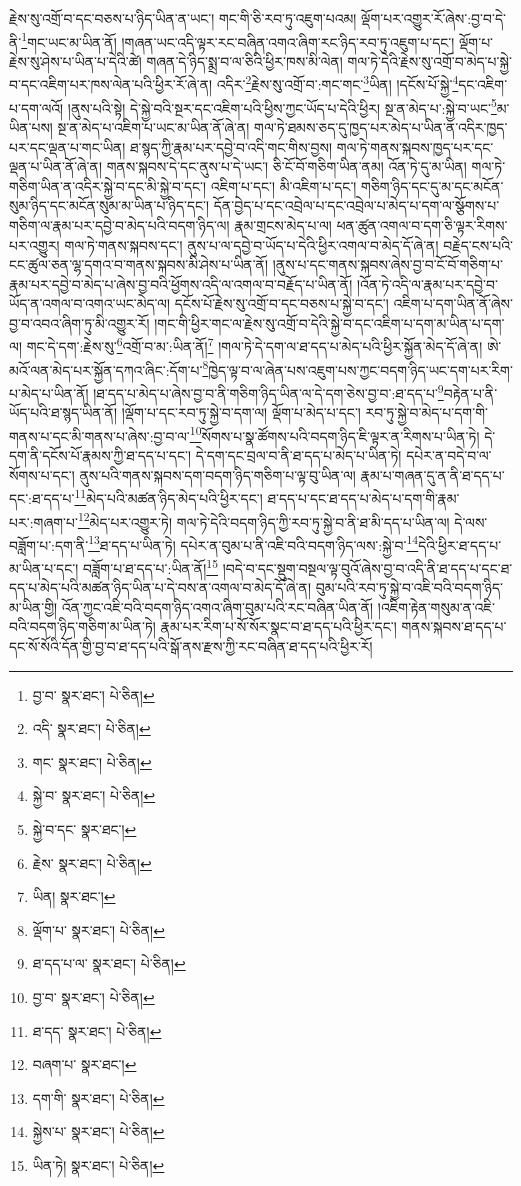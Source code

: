 རྗེས་སུ་འགྲོ་བ་དང་བཅས་པ་ཉིད་ཡིན་ན་ཡང་། གང་གི་ཅི་རབ་ཏུ་འཇུག་པའམ། ལྡོག་པར་འགྱུར་རོ་ཞེས་:བྱ་བ་དེ་ནི་\footnote{བྱ་བ་  སྣར་ཐང་།  པེ་ཅིན། }གང་ཡང་མ་ཡིན་ནོ། །གཞན་ཡང་འདི་ལྟར་རང་བཞིན་འགའ་ཞིག་རང་ཉིད་རབ་ཏུ་འཇུག་པ་དང་། ལྡོག་པ་རྗེས་སུ་ཤེས་པ་ཡིན་པ་དེའི་ཚེ། གཞན་དེ་ཉིད་སྨྲ་བ་ལ་ཅིའི་ཕྱིར་ཁས་མི་ལེན། གལ་ཏེ་དེའི་རྗེས་སུ་འགྲོ་བ་མེད་པ་སྐྱེ་བ་དང་འཇིག་པར་ཁས་ལེན་པའི་ཕྱིར་རོ་ཞེ་ན། འདིར་\footnote{འདི་  སྣར་ཐང་།  པེ་ཅིན། }རྗེས་སུ་འགྲོ་བ་:གང་གང་\footnote{གང་  སྣར་ཐང་།  པེ་ཅིན། }ཡིན། །དངོས་པོ་སྐྱེ་\footnote{སྐྱེ་བ་  སྣར་ཐང་།  པེ་ཅིན། }དང་འཇིག་པ་དག་ལའོ། །ནུས་པའི་སྟེ། དེ་སྐྱེ་བའི་སྔར་དང་འཇིག་པའི་ཕྱིས་ཀྱང་ཡོད་པ་དེའི་ཕྱིར། སྔ་ན་མེད་པ་:སྐྱེ་བ་ཡང་\footnote{སྐྱེ་བ་དང་  སྣར་ཐང་། }མ་ཡིན་པས། སྔ་ན་མེད་པ་འཇིག་པ་ཡང་མ་ཡིན་ནོ་ཞེ་ན། གལ་ཏེ་ཐམས་ཅད་དུ་ཁྱད་པར་མེད་པ་ཡིན་ན་འདིར་ཁྱད་པར་དང་ལྡན་པ་གང་ཡིན། ཐ་སྙད་ཀྱི་རྣམ་པར་དབྱེ་བ་འདི་གང་གིས་བྱས། གལ་ཏེ་གནས་སྐབས་ཁྱད་པར་དང་ལྡན་པ་ཡིན་ནོ་ཞེ་ན། གནས་སྐབས་དེ་དང་ནུས་པ་དེ་ཡང་། ཅི་ངོ་བོ་གཅིག་ཡིན་ནམ། འོན་ཏེ་དུ་མ་ཡིན། གལ་ཏེ་གཅིག་ཡིན་ན་འདིར་སྐྱེ་བ་དང་མི་སྐྱེ་བ་དང་། འཇིག་པ་དང་། མི་འཇིག་པ་དང་། གཅིག་ཉིད་དང་དུ་མ་དང་མངོན་སུམ་ཉིད་དང་མངོན་སུམ་མ་ཡིན་པ་ཉིད་དང་། དོན་བྱེད་པ་དང་འབྲེལ་པ་དང་འབྲེལ་པ་མེད་པ་དག་ལ་སྩོགས་པ་གཅིག་ལ་རྣམ་པར་དབྱེ་བ་མེད་པའི་བདག་ཉིད་ལ། རྣམ་གྲངས་མེད་པ་ལ། ཕན་ཚུན་འགལ་བ་དག་ཅི་ལྟར་རིགས་པར་འགྱུར། གལ་ཏེ་གནས་སྐབས་དང་། ནུས་པ་ལ་དབྱེ་བ་ཡོད་པ་དེའི་ཕྱིར་འགལ་བ་མེད་དོ་ཞེ་ན། བརྗེད་ངས་པའི་ངང་ཚུལ་ཅན་ལྷ་དགའ་བ་གནས་སྐབས་མི་ཤེས་པ་ཡིན་ནོ། །ནུས་པ་དང་གནས་སྐབས་ཞེས་བྱ་བ་ངོ་བོ་གཅིག་པ་རྣམ་པར་དབྱེ་བ་མེད་པ་ཞེས་བྱ་བའི་ཕྱོགས་འདི་ལ་འགལ་བ་བརྗོད་པ་ཡིན་ནོ། །འོན་ཏེ་འདི་ལ་རྣམ་པར་དབྱེ་བ་ཡོད་ན་འགལ་བ་འགའ་ཡང་མེད་ལ། དངོས་པོ་རྗེས་སུ་འགྲོ་བ་དང་བཅས་པ་སྐྱེ་བ་དང་། འཇིག་པ་དག་ཡིན་ནོ་ཞེས་བྱ་བ་འབའ་ཞིག་ཏུ་མི་འགྱུར་རོ། །གང་གི་ཕྱིར་གང་ལ་རྗེས་སུ་འགྲོ་བ་དེའི་སྐྱེ་བ་དང་འཇིག་པ་དག་མ་ཡིན་པ་དག་ལ། གང་དེ་དག་:རྗེས་སུ་\footnote{རྗེས་  སྣར་ཐང་།  པེ་ཅིན། }འགྲོ་བ་མ་:ཡིན་ནོ།\footnote{ཡིན།  སྣར་ཐང་། } །གལ་ཏེ་དེ་དག་ལ་ཐ་དད་པ་མེད་པའི་ཕྱིར་སྐྱོན་མེད་དོ་ཞེ་ན། ཨེ་མའོ་ལན་མེད་པར་སྐྱོན་དཀའ་ཞིང་:དོག་པ་\footnote{ལྡོག་པ་  སྣར་ཐང་།  པེ་ཅིན། }ཁྱེད་ལྟ་བ་ལ་ཞེན་པས་འཇུག་པས་ཀྱང་བདག་ཉིད་ཡང་དག་པར་རིག་པ་མེད་པ་ཡིན་ནོ། །ཐ་དད་པ་མེད་པ་ཞེས་བྱ་བ་ནི་གཅིག་ཉིད་ཡིན་ལ་དེ་དག་ཅེས་བྱ་བ་:ཐ་དད་པ་\footnote{ཐ་དད་པ་ལ་  སྣར་ཐང་།  པེ་ཅིན། }བརྟེན་པ་ནི་ཡོད་པའི་ཐ་སྙད་ཡིན་ནོ། །ལྡོག་པ་དང་རབ་ཏུ་སྐྱེ་བ་དག་ལ། ལྡོག་པ་མེད་པ་དང་། རབ་ཏུ་སྐྱེ་བ་མེད་པ་དག་གི་གནས་པ་དང་མི་གནས་པ་ཞེས་:བྱ་བ་ལ་\footnote{བྱ་བ་  སྣར་ཐང་།  པེ་ཅིན། }སོགས་པ་སྣ་ཚོགས་པའི་བདག་ཉིད་ཇི་ལྟར་ན་རིགས་པ་ཡིན་ཏེ། དེ་དག་ནི་དངོས་པོ་རྣམས་ཀྱི་ཐ་དད་པ་དང་། དེ་དག་དང་བྲལ་བ་ནི་ཐ་དད་པ་མེད་པ་ཡིན་ཏེ། དཔེར་ན་བདེ་བ་ལ་སོགས་པ་དང་། ནུས་པའི་གནས་སྐབས་དག་བདག་ཉིད་གཅིག་པ་ལྟ་བུ་ཡིན་ལ། རྣམ་པ་གཞན་དུ་ན་ནི་ཐ་དད་པ་དང་:ཐ་དད་པ་\footnote{ཐ་དད་  སྣར་ཐང་།  པེ་ཅིན། }མེད་པའི་མཚན་ཉིད་མེད་པའི་ཕྱིར་དང་། ཐ་དད་པ་དང་ཐ་དད་པ་མེད་པ་དག་གི་རྣམ་པར་:གཞག་པ་\footnote{བཞག་པ་  སྣར་ཐང་། }མེད་པར་འགྱུར་ཏེ། གལ་ཏེ་དེའི་བདག་ཉིད་ཀྱི་རབ་ཏུ་སྐྱེ་བ་ནི་ཐ་མི་དད་པ་ཡིན་ལ། དེ་ལས་བཟློག་པ་:དག་ནི་\footnote{དག་གི་  སྣར་ཐང་།  པེ་ཅིན། }ཐ་དད་པ་ཡིན་ཏེ། དཔེར་ན་བུམ་པ་ནི་འཇི་བའི་བདག་ཉིད་ལས་:སྐྱེ་བ་\footnote{སྐྱེས་པ་  སྣར་ཐང་།  པེ་ཅིན། }དེའི་ཕྱིར་ཐ་དད་པ་མ་ཡིན་པ་དང་། བཟློག་པ་ཐ་དད་པ་:ཡིན་ནོ།\footnote{ཡིན་ཏེ།  སྣར་ཐང་།  པེ་ཅིན། } །བདེ་བ་དང་སྡུག་བསྔལ་ལྟ་བུའོ་ཞེས་བྱ་བ་འདི་ནི་ཐ་དད་པ་དང་ཐ་དད་པ་མེད་པའི་མཚན་ཉིད་ཡིན་པ་དེ་བས་ན་འགལ་བ་མེད་དོ་ཞེ་ན། བུམ་པའི་རབ་ཏུ་སྐྱེ་བ་འཇི་བའི་བདག་ཉིད་མ་ཡིན་གྱི། འོན་ཀྱང་འཇི་བའི་བདག་ཉིད་འགའ་ཞིག་བུམ་པའི་རང་བཞིན་ཡིན་ནོ། །འཇིག་རྟེན་གསུམ་ན་འཇི་བའི་བདག་ཉིད་གཅིག་མ་ཡིན་ཏེ། རྣམ་པར་རིག་པ་སོ་སོར་སྣང་བ་ཐ་དད་པའི་ཕྱིར་དང་། གནས་སྐབས་ཐ་དད་པ་དང་སོ་སོའི་དོན་གྱི་བྱ་བ་ཐ་དད་པའི་སྒོ་ནས་རྫས་ཀྱི་རང་བཞིན་ཐ་དད་པའི་ཕྱིར་རོ། 